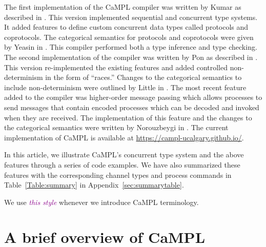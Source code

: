 \documentclass[11pt]{article}
\newcommand{\tc}[1]{\textcolor{darkMagenta}{\textit{#1}}}
\newcommand{\note}[1]{\textcolor{blue}{#1}}
\begin{document}
The first implementation of the CaMPL compiler was written by Kumar as described in \cite{Ku18}.
This version implemented sequential and concurrent type systems.
It added features to define custom concurrent data types called protocols and coprotocols.
The categorical semantics for protocols and coprotocols were given by Yeasin in \cite{Ye12}.
This compiler performed both a type inference and type checking.
The second implementation of the compiler was written by Pon as described in \cite{Po21, Po22}.
This version re-implemented the existing features and added controlled non-determinism in the form of ``races.''
Changes to the categorical semantics to include non-determinism were outlined by Little in \cite{xanna, xanna2}.
The most recent feature added to the compiler was higher-order message passing which allows processes to send messages that contain encoded processes which can be decoded and invoked when they are received.
The implementation of this feature and the changes to the categorical semantics were written by Norouzbeygi in \cite{No25}. 
The current implementation of CaMPL is available at \url{https://campl-ucalgary.github.io/}.

In this article, we illustrate CaMPL's concurrent type system and the above features through a series of code examples.
We have also summarized these features with the corresponding channel types and process commands in Table~\ref{Table:summary} in Appendix~\ref{sec:summarytable}.

We use \tc{this style} whenever we introduce CaMPL terminology.

\section{A brief overview of CaMPL}
\label{Sec:overview}
\end{document}
